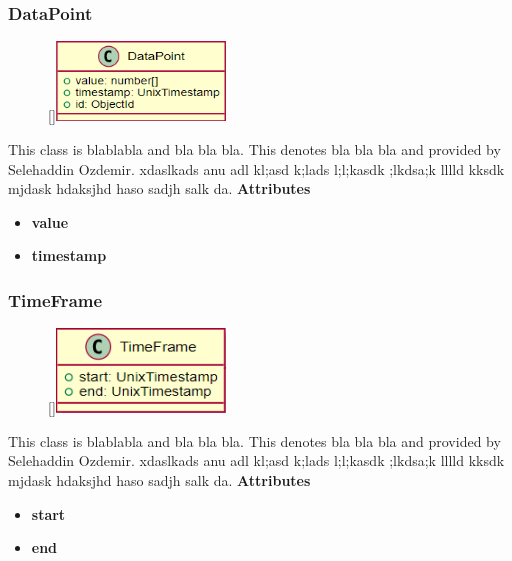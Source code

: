 \subsubsection{DataPoint}
\begin{figure}
    \raisebox{0pt}[\dimexpr{}\baselineskip\relax]{\includegraphics[width=4.5cm]{classes/workspace-management/9.png}}
\end{figure} 
\par
This class is blablabla and bla bla bla. This denotes bla bla bla and provided by Selehaddin Ozdemir. xdaslkads anu adl kl;asd k;lads l;l;kasdk ;lkdsa;k lllld kksdk mjdask hdaksjhd haso sadjh salk da.
\newline
\newline
\textbf{Attributes}
\begin{itemize}
    \item \textbf{value}
    \item \textbf{timestamp}
\end{itemize}

\subsubsection{TimeFrame}
\begin{figure}
    \raisebox{0pt}[\dimexpr{}\baselineskip\relax]{\includegraphics[width=4.5cm]{classes/workspace-management/10.png}}
\end{figure} 
\par
This class is blablabla and bla bla bla. This denotes bla bla bla and provided by Selehaddin Ozdemir. xdaslkads anu adl kl;asd k;lads l;l;kasdk ;lkdsa;k lllld kksdk mjdask hdaksjhd haso sadjh salk da.
\newline
\newline
\textbf{Attributes}
\begin{itemize}
    \item \textbf{start}
    \item \textbf{end}
\end{itemize}

